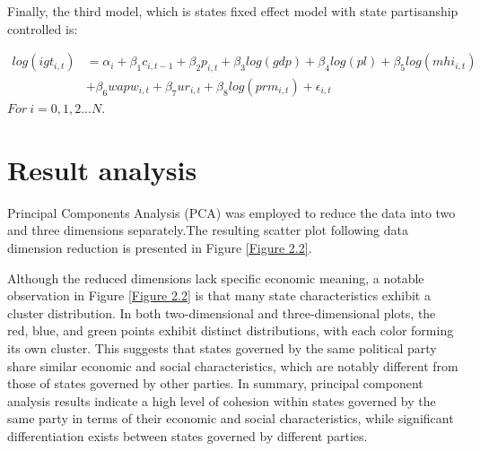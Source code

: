 Finally, the third model, which is states fixed effect model with state partisanship controlled is:

\begin{equation}
    \begin{split}
        log(igt_{i,t}) & = \alpha_i + \beta_1 c_{i,t-1} + \beta_2 p_{i,t} + \beta_3 log(gdp) + \beta_4 log(pl) + \beta_5 log(mhi_{i,t}) \\
        &+ \beta_6 wapw_{i,t} + \beta_7 ur_{i,t} +\beta_8 log(prm_{i,t}) + \epsilon_{i,t}
    \end{split}
\end{equation}
$For\ i = 0,1,2...N$.



\section{Result analysis}

Principal Components Analysis (PCA) was employed to reduce the data into two and three dimensions separately.The resulting scatter plot following data dimension reduction is presented in Figure \ref{Figure 2.2}.


Although the reduced dimensions lack specific economic meaning, a notable observation in Figure \ref{Figure 2.2} is that many state characteristics exhibit a cluster distribution. In both two-dimensional and three-dimensional plots, the red, blue, and green points exhibit distinct distributions, with each color forming its own cluster. This suggests that states governed by the same political party share similar economic and social characteristics, which are notably different from those of states governed by other parties. In summary, principal component analysis results indicate a high level of cohesion within states governed by the same party in terms of their economic and social characteristics, while significant differentiation exists between states governed by different parties.

